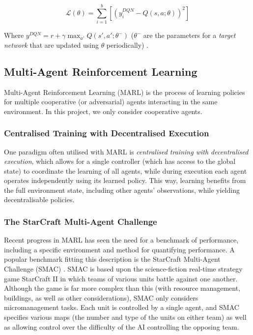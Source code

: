 \[\mathscr{L}(\theta)=\sum_{i=1}^{b}[(y_i^{DQN}-Q(s,a;\theta))^2]\]

Where $y^{DQN}=r+\gamma \max_{a'}Q(s',a';\theta^-)$ ($\theta^-$ are the parameters for a \textit{target network} that are updated using $\theta$ periodically) \cite{qmixcite}.



\subsection{Multi-Agent Reinforcement Learning}
Multi-Agent Reinforcement Learning (MARL) is the process of learning policies for multiple cooperative (or adversarial) agents interacting in the same environment. In this project, we only consider cooperative agents. 


\subsubsection{Centralised Training with Decentralised Execution}

One paradigm often utilised with MARL is \textit{centralised training with decentralised execution}, which allows for a single controller (which has access to the global state) to coordinate the learning of all agents, while during execution each agent operates independently using its learned policy. This way, learning benefits from the full environment state, including other agents' observations, while yielding decentralisable policies.

\subsubsection{The StarCraft Multi-Agent Challenge}

Recent progress in MARL has seen the need for a benchmark of performance, including a specific environment and method for quantifying performance. A popular benchmark fitting this description is the StarCraft Multi-Agent Challenge (SMAC) \cite{smac}. SMAC is based upon the science-fiction real-time strategy game StarCraft II in which teams of various units battle against one another. Although the game is far more complex than this (with resource management, buildings, as well as other considerations), SMAC only considers micromanagement tasks. Each unit is controlled by a single agent, and SMAC specifies various maps (the number and type of the units on either team) as well as allowing control over the difficulty of the AI controlling the opposing team. 


